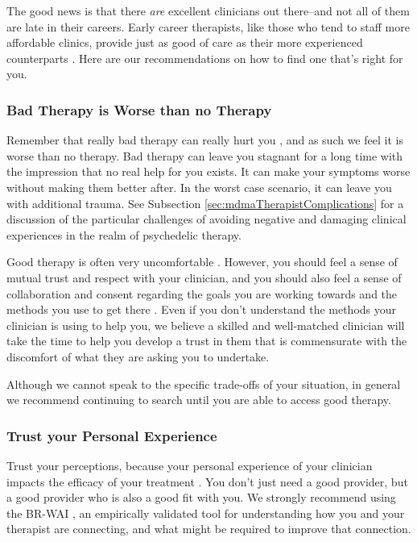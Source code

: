 \documentclass[12pt,letterpaper]{book}
\begin{document}
The good news is that there \textit{are} excellent clinicians out there–and not all of them are late in their careers. Early career therapists, like those who tend to staff more affordable clinics, provide just as good of care as their more experienced counterparts \cite{goldberg2016psychotherapists}. Here are our recommendations on how to find one that's right for you.

\subsubsection*{Bad Therapy is Worse than no Therapy}
Remember that really bad therapy can really hurt you \cite{hook2018boundary}, and as such we feel it is worse than no therapy. Bad therapy can leave you stagnant for a long time with the impression that no real help for you exists. It can make your symptoms worse without making them better after. In the worst case scenario, it can leave you with additional trauma. See Subsection \ref{sec:mdmaTherapistComplications} for a discussion of the particular challenges of avoiding negative and damaging clinical experiences in the realm of psychedelic therapy.

Good therapy is often very uncomfortable \cite{eckerUnlocking}. However, you should feel a sense of mutual trust and respect with your clinician, and you should also feel a sense of collaboration and consent regarding the goals you are working towards and the methods you use to get there \cite{BRWAIdownload}. Even if you don't understand the methods your clinician is using to help you, we believe a skilled and well-matched clinician will take the time to help you develop a trust in them that is commensurate with the discomfort of what they are asking you to undertake.

Although we cannot speak to the specific trade-offs of your situation, in general we recommend continuing to search until you are able to access good therapy.

\subsubsection*{Trust your Personal Experience}
Trust your perceptions, because your personal experience of your clinician impacts the efficacy of your treatment \cite{horvath2011alliance}. You don't just need a good provider, but a good provider who is also a good fit with you. We strongly recommend using the BR-WAI \cite{BRWAIdownload}, an empirically validated tool for understanding how you and your therapist are connecting, and what might be required to improve that connection.
\end{document}
